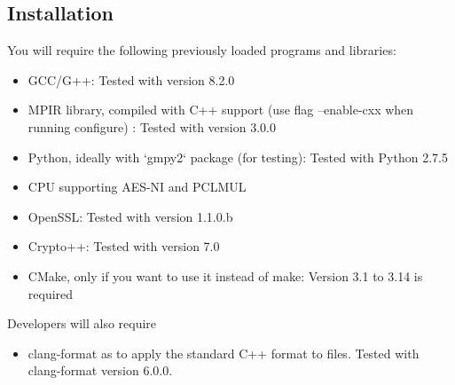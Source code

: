 
\subsection{Installation}
You will require the following previously loaded programs and 
libraries:
\begin{itemize}
\item GCC/G++: Tested with version 8.2.0 
\item MPIR library, compiled with C++ support (use flag --enable-cxx when running configure) : Tested with version 3.0.0
\item Python, ideally with `gmpy2` package (for testing): Tested with Python 2.7.5
\item CPU supporting AES-NI and PCLMUL
\item OpenSSL: Tested with version 1.1.0.b
\item Crypto++: Tested with version 7.0
\item CMake, only if you want to use it instead of make: Version 3.1 to 3.14 is required
\end{itemize}
Developers will also require
\begin{itemize}
\item clang-format as to apply the standard C++ format to files. Tested with clang-format version 6.0.0.
\end{itemize}

